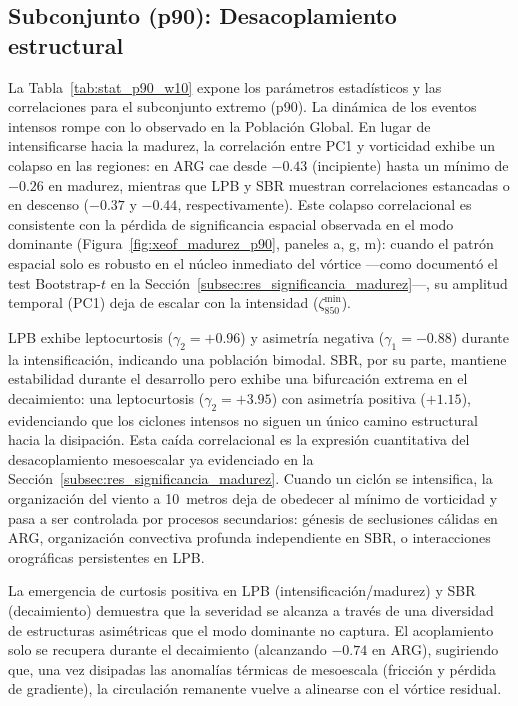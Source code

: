 

\subsection{Subconjunto (p90): Desacoplamiento estructural}

La Tabla~\ref{tab:stat_p90_w10} expone los parámetros estadísticos y las correlaciones para el subconjunto extremo (p90). 
La dinámica de los eventos intensos rompe con lo observado en la Población Global. 
En lugar de intensificarse hacia la madurez, la correlación entre PC1 y vorticidad exhibe un colapso en las regiones: en ARG cae desde $-0.43$ (incipiente) hasta un mínimo de $-0.26$ en madurez, mientras que LPB y SBR muestran correlaciones estancadas o en descenso ($-0.37$ y $-0.44$, respectivamente). 
Este colapso correlacional es consistente con la pérdida de significancia espacial observada en el modo dominante (Figura~\ref{fig:xeof_madurez_p90}, paneles a, g, m): cuando el patrón espacial solo es robusto en el núcleo inmediato del vórtice ---como documentó el test Bootstrap-$t$ en la Sección~\ref{subsec:res_significancia_madurez}---, su amplitud temporal (PC1) deja de escalar con la intensidad ($\zeta_{850}^{\min}$).

LPB exhibe leptocurtosis ($\gamma_2 = +0.96$) y asimetría negativa ($\gamma_1 = -0.88$) durante la intensificación, indicando una población bimodal. 
SBR, por su parte, mantiene estabilidad durante el desarrollo pero exhibe una bifurcación extrema en el decaimiento: una leptocurtosis ($\gamma_2 = +3.95$) con asimetría positiva ($+1.15$), evidenciando que los ciclones intensos no siguen un único camino estructural hacia la disipación.
Esta caída correlacional es la expresión cuantitativa del desacoplamiento mesoescalar ya evidenciado en la Sección~\ref{subsec:res_significancia_madurez}. 
Cuando un ciclón se intensifica, la organización del viento a 10~metros deja de obedecer al mínimo de vorticidad y pasa a ser controlada por procesos secundarios: génesis de seclusiones cálidas en ARG, organización convectiva profunda independiente en SBR, o interacciones orográficas persistentes en LPB. 

La emergencia de curtosis positiva en LPB (intensificación/madurez) y SBR (decaimiento) demuestra que la severidad se alcanza a través de una diversidad de estructuras asimétricas que el modo dominante no captura. 
El acoplamiento solo se recupera durante el decaimiento (alcanzando $-0.74$ en ARG), sugiriendo que, una vez disipadas las anomalías térmicas de mesoescala (fricción y pérdida de gradiente), la circulación remanente vuelve a alinearse con el vórtice residual.


